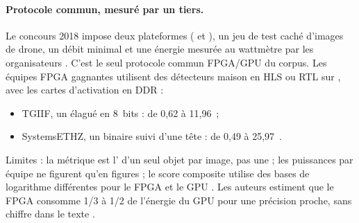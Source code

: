 \paragraph{Protocole commun, mesuré par un tiers.} Le concours  2018
\citep{2021-xu-dac-sdc-low-power-object} impose deux plateformes ( et ),
un jeu de test caché d'images de drone, un débit minimal et une énergie mesurée au
wattmètre par les organisateurs . C'est le seul protocole commun FPGA/GPU du
corpus. Les équipes FPGA gagnantes utilisent des détecteurs maison en HLS ou RTL sur
, avec les cartes d'activation en DDR  :
\begin{itemize}
  \item TGIIF, un  élagué en 8~bits :  de 0,62 à 11,96\,  ;
  \item SystemsETHZ, un  binaire suivi d'une tête  :  de 0,49 à
    25,97\, .
\end{itemize}
Limites : la métrique est l' d'un seul objet par image, pas une  ; les puissances
par équipe ne figurent qu'en figures ; le score composite utilise des bases de logarithme
différentes pour le FPGA et le GPU . Les auteurs estiment que le FPGA consomme
1/3 à 1/2 de l'énergie du GPU pour une précision proche, sans chiffre dans le texte
.

